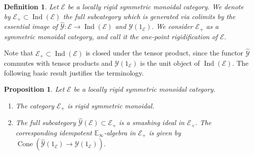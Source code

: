 \documentclass[11pt,leqno]{amsart}
\newtheorem{defi}[theo]{Definition}
\newtheorem{prop}[theo]{Proposition}
\numberwithin{equation}{section}
\newcommand{\Cone}{\operatorname{Cone}}
\newcommand{\bE}{{\mathbb E}}
\newcommand{\cE}{{\mathcal E}}
\newcommand{\cY}{{\mathcal Y}}
\newcommand{\Ind}{\operatorname{Ind}}
\begin{document}
\begin{defi}\label{def:one_point_rigidification}
	Let $\cE$ be a locally rigid symmetric monoidal category. We denote by $\cE_+\subset\Ind(\cE)$ the full subcategory which is generated via colimits by the essential image of $\hat{\cY}:\cE\to\Ind(\cE)$ and $\cY(1_{\cE}).$ We consider $\cE_+$ as a symmetric monoidal category, and call it the one-point rigidification of $\cE.$
\end{defi}

Note that $\cE_+\subset\Ind(\cE)$ is closed under the tensor product, since the functor $\hat{\cY}$ commutes with tensor products and $\cY(1_{\cE})$ is the unit object of $\Ind(\cE).$ The following basic result justifies the terminology.

\begin{prop}
	Let $\cE$ be a locally rigid symmetric monoidal category.
	\begin{enumerate}[label=(\roman*),ref=(\roman*)]
		\item The category $\cE_+$ is rigid symmetric monoidal. \label{E_+_rigid}
		
		\item  The full subcategory $\hat{\cY}(\cE)\subset \cE_+$ is a smashing ideal in $\cE_+.$ The corresponding idempotent $\bE_{\infty}$-algebra in $\cE_+$ is given by $\Cone(\hat{\cY}(1_{\cE})\to\cY(1_{\cE})).$ \label{smashing_ideal}
	\end{enumerate}
\end{prop}
\end{document}
